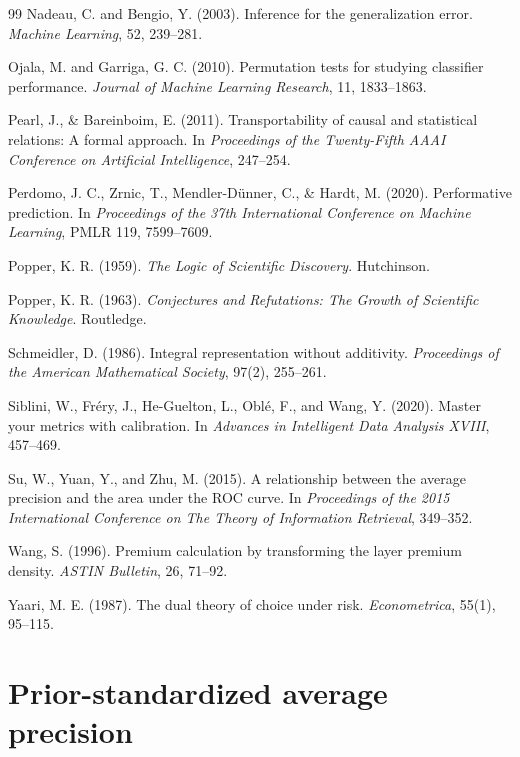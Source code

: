 \documentclass[11pt]{article}
\theoremstyle{remark}
\begin{document}
\begin{thebibliography}{99}
Nadeau, C. and Bengio, Y. (2003).
Inference for the generalization error.
\emph{Machine Learning}, 52, 239--281.

Ojala, M. and Garriga, G. C. (2010).
Permutation tests for studying classifier performance.
\emph{Journal of Machine Learning Research}, 11, 1833--1863.

Pearl, J., \& Bareinboim, E. (2011).
Transportability of causal and statistical relations: A formal approach.
In \emph{Proceedings of the Twenty-Fifth AAAI Conference on Artificial Intelligence}, 247--254.

Perdomo, J. C., Zrnic, T., Mendler-D\"unner, C., \& Hardt, M. (2020).
Performative prediction.
In \emph{Proceedings of the 37th International Conference on Machine Learning}, PMLR 119, 7599--7609.

Popper, K. R. (1959).
\emph{The Logic of Scientific Discovery}.
Hutchinson.

Popper, K. R. (1963).
\emph{Conjectures and Refutations: The Growth of Scientific Knowledge}.
Routledge.

Schmeidler, D. (1986).
Integral representation without additivity.
\emph{Proceedings of the American Mathematical Society}, 97(2), 255--261.

Siblini, W., Fr\'ery, J., He-Guelton, L., Obl\'e, F., and Wang, Y. (2020).
Master your metrics with calibration.
In \emph{Advances in Intelligent Data Analysis XVIII}, 457--469.

Su, W., Yuan, Y., and Zhu, M. (2015).
A relationship between the average precision and the area under the ROC curve.
In \emph{Proceedings of the 2015 International Conference on The Theory of Information Retrieval}, 349--352.

Wang, S. (1996).
Premium calculation by transforming the layer premium density.
\emph{ASTIN Bulletin}, 26, 71--92.

Yaari, M. E. (1987).
The dual theory of choice under risk.
\emph{Econometrica}, 55(1), 95--115.

\end{thebibliography}

\appendix

\section{Prior-standardized average precision}
\label{app:ap-definition}
\end{document}
